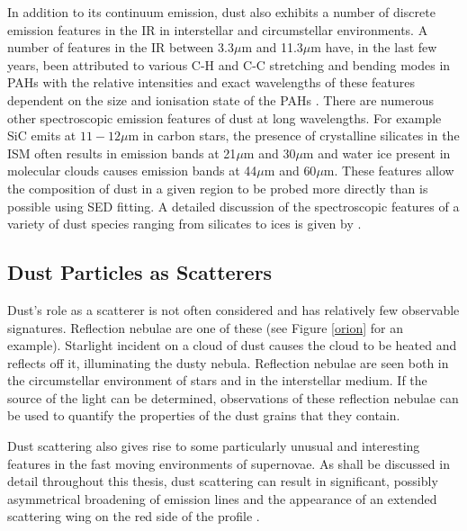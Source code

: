 In addition to its continuum emission, dust also exhibits a number of discrete emission features in the IR in interstellar and circumstellar environments.  A number of features in the IR between 3.3$\mu$m and 11.3$\mu$m have, in the last few years, been attributed to various {C-H} and {C-C} stretching and bending modes in PAHs with the relative intensities and exact wavelengths of these features dependent on the size and ionisation state of the PAHs \citep{Draine2001}.  There are numerous other spectroscopic emission features of dust at long wavelengths.  For example SiC emits at $11-12\mu$m in carbon stars, the presence of crystalline silicates in the ISM often results in emission bands at 21$\mu$m and $30\mu$m and water ice present in  molecular clouds causes emission bands at 44$\mu$m and $60\mu$m.  These features allow the composition of dust in a given region to be probed more directly than is possible using SED fitting.  A detailed discussion of the spectroscopic features of a variety of dust species ranging from silicates to ices is given by \citet{Draine2003}. 

\subsection{Dust Particles as Scatterers}
\label{scn:le}
Dust's role as a scatterer is not often considered and has relatively few observable signatures.  Reflection nebulae are one of these (see Figure \ref{orion} for an example).  Starlight incident on a cloud of dust causes the cloud to be heated and reflects off it,  illuminating the dusty nebula.  Reflection nebulae are seen both in the circumstellar environment of stars and in the interstellar medium.  If the source of the light can be determined, observations of these reflection nebulae can be used to quantify the properties of the dust grains that they contain.  

Dust scattering also gives rise to some particularly unusual and interesting features in the fast moving environments of supernovae.  As shall be discussed in detail throughout this thesis, dust scattering can result in significant, possibly asymmetrical broadening of emission lines and the appearance of an extended scattering wing on the red side of the profile \citep{Lucy1989}. 

